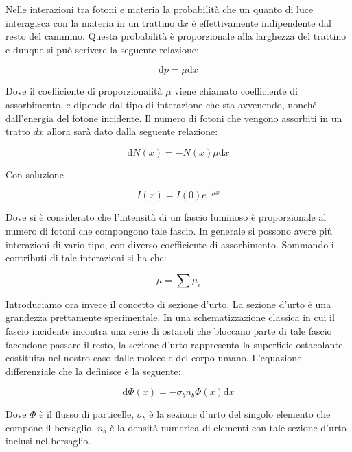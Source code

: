 Nelle interazioni tra fotoni e materia la probabilità che un quanto di luce interagisca con la materia in un trattino $\mathrm{d}x$ è effettivamente indipendente dal resto del cammino. Questa probabilità è proporzionale alla larghezza del trattino e dunque si può scrivere la seguente relazione:

\begin{equation}
\mathrm{d}p=\mu \mathrm{d}x
\end{equation}

Dove il coefficiente di proporzionalità $\mu$ viene chiamato coefficiente di assorbimento, e dipende dal tipo di interazione che sta avvenendo, nonché dall'energia del fotone incidente. Il numero di fotoni che vengono assorbiti in un tratto $dx$ allora sarà dato dalla seguente relazione:

\begin{equation}
\mathrm{d}N(x)=-N(x)\mu \mathrm{d}x
\end{equation}

Con soluzione

\begin{equation}
I(x)=I(0)e^{-\mu x}
\label{Intensity}
\end{equation}

Dove si è considerato che l'intensità di un fascio luminoso è proporzionale al numero di fotoni che compongono tale fascio.
In generale si possono avere più interazioni di vario tipo, con diverso coefficiente di assorbimento. Sommando i contributi di tale interazioni si ha che:

\begin{equation}
\mu=\sum \mu_{i}
\end{equation}

Introduciamo ora invece il concetto di sezione d'urto. 
La sezione d'urto è una grandezza prettamente sperimentale. In una schematizzazione classica in cui il fascio incidente incontra una serie di ostacoli che bloccano parte di tale fascio facendone passare il resto, la sezione d'urto rappresenta la superficie ostacolante costituita nel nostro caso dalle molecole del corpo umano. L'equazione differenziale che la definisce è la seguente:

\begin{equation}
\mathrm{d}\Phi(x)=-\sigma_{b}n_{b}\Phi(x)\mathrm{d}x
\end{equation}

Dove $\Phi$ è il flusso di particelle, $\sigma_{b}$ è la sezione d'urto del singolo elemento che compone il bersaglio, $n_b$ è la densità numerica di elementi con tale sezione d'urto inclusi nel bersaglio.

